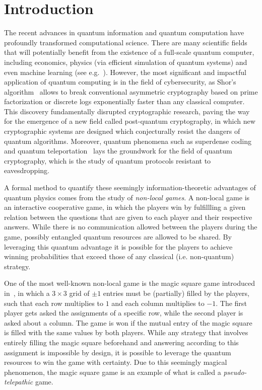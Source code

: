 \section{Introduction}


The recent advances in quantum information and quantum computation have profoundly transformed computational science.
There are many scientific fields that will potentially benefit from the existence of a full-scale quantum computer, 
including economics, physics (via efficient simulation of quantum systems)
and even machine learning (see e.g.~\cite{du2025quantummachinelearninghandson}).
However, the most significant and impactful application of quantum computing is in the field of
cybersecurity, as Shor's algorithm~\cite{Shor_1997} allows to break conventional asymmetric cryptography
based on prime factorization or discrete logs exponentially faster than any classical computer.
This discovery fundamentally disrupted cryptographic research, paving the way for the emergence of a new field
called post-quantum cryptography, in which new cryptographic systems are designed which conjecturally resist the
dangers of quantum algorithms.
Moreover, quantum phenomena such as superdense coding~\cite{Harrow_2004} and quantum teleportation~\cite{PhysRevLett.70.1895}
lays the groundwork for the field of quantum cryptography,
which is the study of quantum protocols resistant to eavesdropping.

A formal method to quantify these seemingly information-theoretic advantages of quantum physics
comes from the study of \emph{non-local games}.
A non-local game is an interactive cooperative game, in which the players win by fulfillling 
a given relation between the questions that are given to each player and their respective answers. 
While there is no communication allowed between the players during the game, possibly entangled quantum resources are allowed to be shared.
By leveraging this quantum advantage it is possible for the players to achieve winning
probabilities that exceed those of any classical (i.e. non-quantum) strategy.

One of the most well-known non-local game is the magic square game
introduced in~\cite{aravind2003simpledemonstrationbellstheorem},
in which a $3 \times 3$ grid of $\pm1$ entries must be (partially) filled by the players,
such that each row multiplies to $1$ and each column multiplies to $-1$.
The first player gets asked the assignments of a specific row, while the second player
is asked about a column. The game is won if the mutual entry of the magic square is
filled with the same values by both players.
While any strategy that involves entirely filling the magic square beforehand and answering 
according to this assignment is impossible by design, it is possible to leverage the quantum resources to 
win the game with certainty.
Due to this seemingly magical phenomenon,
the magic square game is an example of what is called a \emph{pseudo-telepathic} game.

